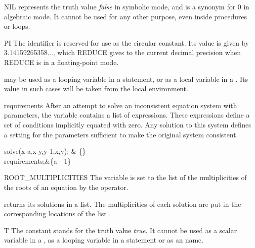 \begin{Constant}{NIL}
 represents the truth value {\it false} in symbolic mode, and is
a synonym for 0 in algebraic mode.  It cannot be used for any other
purpose, even inside procedures or  loops.
\end{Constant}


\begin{Constant}{PI}
The identifier  is reserved for use as the circular constant.
Its value is given by 3.14159265358..., which REDUCE gives to the current
decimal precision when REDUCE is in a floating-point mode.

\begin{Comments}
 may be used as a looping variable in a  statement,
or as a local variable in a .  Its value in such cases
will be taken from the local environment.
\end{Comments}
\end{Constant}

\begin{Variable}{requirements}
After an attempt to solve an inconsistent equation system
with parameters, the variable  contains a list 
of expressions. These expressions define a set of conditions implicitly
equated with zero. Any solution to this system defines a setting for
the parameters sufficient to make the original system consistent.
\begin{Examples}
solve({x-a,x-y,y-1},{x,y}); & \{\}\\
requirements;&\{a - 1\}
\end{Examples}
\end{Variable}

\begin{Variable}{ROOT\_MULTIPLICITIES}
The  variable is set to the list of the
multiplicities of the roots of an equation by the  operator.

\begin{Comments}
 returns its solutions in a list.  The multiplicities of
each solution are put in the corresponding locations of the list
.
\end{Comments}
\end{Variable}


\begin{Constant}{T}
The constant  stands for the truth value {\it true}.  It cannot be used
as a scalar variable in a , as a looping variable in a
 statement or as an  name.

\end{Constant}

